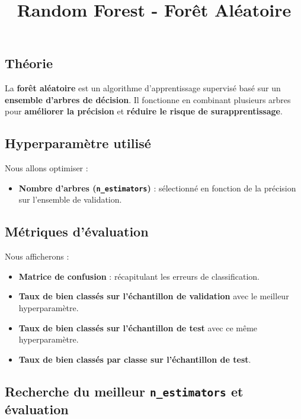 \documentclass[
  letterpaper,
  DIV=11,
  numbers=noendperiod]{scrartcl}
\title{Random Forest - Forêt Aléatoire}
\author{}
\date{}
\providecommand{\tightlist}{%
  \setlength{\itemsep}{0pt}\setlength{\parskip}{0pt}}\usepackage{longtable,booktabs,array}
\begin{document}
\maketitle


\subsection{Théorie}\label{thuxe9orie}

La \textbf{forêt aléatoire} est un algorithme d'apprentissage supervisé
basé sur un \textbf{ensemble d'arbres de décision}. Il fonctionne en
combinant plusieurs arbres pour \textbf{améliorer la précision} et
\textbf{réduire le risque de surapprentissage}.

\subsection{Hyperparamètre utilisé}\label{hyperparamuxe8tre-utilisuxe9}

Nous allons optimiser :

\begin{itemize}
\tightlist
\item
  \textbf{Nombre d'arbres (\texttt{n\_estimators})} : sélectionné en
  fonction de la précision sur l'ensemble de validation.
\end{itemize}

\subsection{Métriques d'évaluation}\label{muxe9triques-duxe9valuation}

Nous afficherons :

\begin{itemize}
\tightlist
\item
  \textbf{Matrice de confusion} : récapitulant les erreurs de
  classification.
\item
  \textbf{Taux de bien classés sur l'échantillon de validation} avec le
  meilleur hyperparamètre.
\item
  \textbf{Taux de bien classés sur l'échantillon de test} avec ce même
  hyperparamètre.
\item
  \textbf{Taux de bien classés par classe sur l'échantillon de test}.
\end{itemize}

\subsection{\texorpdfstring{Recherche du meilleur \texttt{n\_estimators}
et
évaluation}{Recherche du meilleur n\_estimators et évaluation}}\label{recherche-du-meilleur-n_estimators-et-uxe9valuation}
\end{document}
